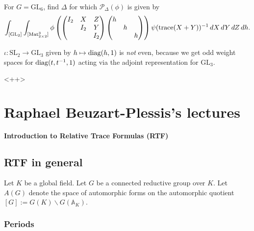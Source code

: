 \documentclass[reqno]{amsart} 
\begin{document}
\begin{exercise}\label{exercise:cq6tho3oca}
  For $G = \mathrm{GL}_6$, find $\Delta$ for which $\mathcal{P}_\Delta(\phi)$ is given by
  \begin{equation*}
    \int_{[\mathrm{GL}_2]} \int_{[\operatorname{Mat}_{2 \times 2}^3]} \phi
    \left(
      \begin{pmatrix}
        I_2      & X & Z \\
                 & I_2 & Y \\
                 &  & I_2 \\
      \end{pmatrix}
      \begin{pmatrix}
        h      &  &  \\
               & h &  \\
               &  & h \\
      \end{pmatrix}\right)
    \psi(\operatorname{trace}(X + Y))^{-1}
    \, d X \, d Y \, d Z \, d h.
  \end{equation*}
\end{exercise}

\begin{example}\label{example:cq6tho3m7k}
  $\iota : \mathrm{SL}_2 \rightarrow \mathrm{GL}_3$ given by $h \mapsto \operatorname{diag}(h, 1)$ is \emph{not} even, because we get odd weight spaces for $\operatorname{diag}(t, t^{-1}, 1)$ acting via the adjoint representation for $\mathrm{GL}_3$.
\end{example}<++>

\section{Raphael Beuzart-Plessis's lectures}\label{sec:cq6tho1cgx}
\textbf{Introduction to Relative Trace Formulas (RTF)}

\subsection{RTF in general}\label{sec:cq6tho1blx}

Let $K$ be a global field.  Let $G$ be a connected reductive group over $K$.  Let $A(G)$ denote the space of automorphic forms on the automorphic quotient $[G] := G(K) \backslash G(\mathbb{A}_K)$.

\subsubsection{Periods}\label{sec:cq6tho1auw}
\end{document}
